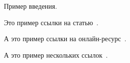 Пример введения.

Это пример ссылки на статью~\cite{shelekhov1999data}.

А это пример ссылки на онлайн-ресурс~\cite{cwe703}.

А это пример нескольких ссылок~\cite{sonarqube-warn-types, spotbugs-warn-types, infer-warn-types, detekt-warn-types}.
